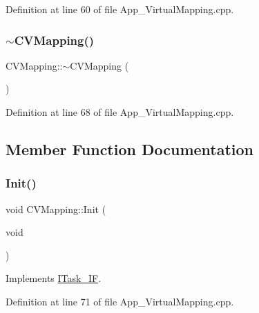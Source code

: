 Definition at line 60 of file App\+\_\+\+Virtual\+Mapping.\+cpp.

\mbox{\label{class_c_v_mapping_af597f7af00322fe01ec8f74838b06f08}} 
\subsubsection{\texorpdfstring{$\sim$\+C\+V\+Mapping()}{~CVMapping()}}
{\footnotesize\ttfamily C\+V\+Mapping\+::$\sim$\+C\+V\+Mapping (\begin{DoxyParamCaption}{ }\end{DoxyParamCaption})}



Definition at line 68 of file App\+\_\+\+Virtual\+Mapping.\+cpp.



\subsection{Member Function Documentation}
\mbox{\label{class_c_v_mapping_a110257122b8946bcb8f17051070e03eb}} 
\subsubsection{\texorpdfstring{Init()}{Init()}}
{\footnotesize\ttfamily void C\+V\+Mapping\+::\+Init (\begin{DoxyParamCaption}\item[{void}]{ }\end{DoxyParamCaption})\hspace{0.3cm}{\ttfamily [virtual]}}



Implements \mbox{\hyperlink{class_i_task___i_f_a28f608bdb9b19658403f7b9b7421968d}{I\+Task\+\_\+\+IF}}.



Definition at line 71 of file App\+\_\+\+Virtual\+Mapping.\+cpp.

\mbox{\label{class_c_v_mapping_a8f064fcfd01953d7072efd5de23f89ef}} 
